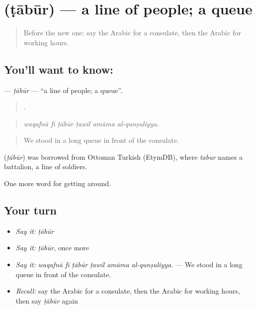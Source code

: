 \section[\texorpdfstring{\ar{طابور} (ṭābūr)}{طابور (ṭābūr)}]{ (ṭābūr) — a line of people; a queue}

\label{lesson:AR-C450-tabur}



\begin{quote}
Before the new one: say the Arabic for a consulate, then the Arabic for working hours.
\end{quote}

\subsection*{You'll want to know: }
\textbf{} — \emph{ṭābūr} — \textquotedblleft{}a line of people; a queue\textquotedblright{}.

\begin{quote}
     .
\end{quote}

\begin{quote}
\emph{waqafnā fī ṭābūr ṭawīl amāma al-qunṣuliyya.}
\end{quote}

\begin{quote}
We stood in a long queue in front of the consulate.
\end{quote}

\begin{cousinweb}
\textbf{} (\emph{ṭābūr}) was borrowed from Ottoman Turkish (EtymDB), where \emph{tabur} names a battalion, a line of soldiers.
\end{cousinweb}

\begin{grammarlens}[title={What you've built}]
One more word for getting around.
\end{grammarlens}

\subsection*{Your turn}
\begin{itemize}
\raggedright
  \item \emph{Say it:} \emph{ṭābūr}
  \item \emph{Say it:} \emph{ṭābūr}, once more
  \item \emph{Say it:} \emph{waqafnā fī ṭābūr ṭawīl amāma al-qunṣuliyya.} — We stood in a long queue in front of the consulate.
  \item \emph{Recall:} say the Arabic for a consulate, then the Arabic for working hours, then say \emph{ṭābūr} again
\end{itemize}

